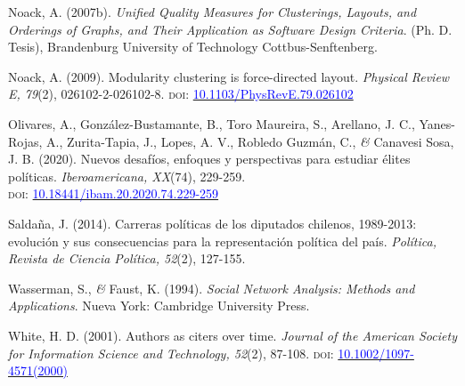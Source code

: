 \documentclass[a4paper]{tufte-handout}
\begin{document}
{\begin{list}{}
\item{\small Noack, A. (2007b). {\itshape Unified Quality Measures for Clusterings, Layouts, and Orderings of Graphs, and Their Application as Software Design Criteria}. (Ph. D. Tesis), Brandenburg University of Technology Cottbus-Senftenberg.}

\item{\small Noack, A. (2009). Modularity clustering is force-directed layout. {\itshape Physical Review E, 79}(2), 026102-2-026102-8. {\scshape doi:} \href{https://doi.org/10.1103/PhysRevE.79.026102}{\textcolor{blue}{10.1103/PhysRevE.79.026102}}}

\item{\small Olivares, A., González-Bustamante, B., Toro Maureira, S., Arellano, J. C., Yanes-Rojas, A., Zurita-Tapia, J., Lopes, A. V., Robledo Guzmán, C., {\itshape \&} Canavesi Sosa, J. B. (2020). Nuevos desafíos, enfoques y perspectivas para estudiar élites políticas. {\itshape Iberoamericana, XX}(74), 229-259. \\ {\scshape doi:} \href{http://doi.org/10.18441/ibam.20.2020.74.229-259}{\textcolor{blue}{10.18441/ibam.20.2020.74.229-259}}}


\item{\small Salda\~na, J. (2014). Carreras pol\'iticas de los diputados chilenos, 1989-2013: evoluci\'on y sus consecuencias para la representaci\'on pol\'itica del pa\'is. {\itshape Pol\'itica, Revista de Ciencia Pol\'itica, 52}(2), 127-155.}

\item{\small Wasserman, S., {\itshape \&} Faust, K. (1994). {\itshape Social Network Analysis: Methods and Applications}. Nueva York: Cambridge University Press.}

\item{\small White, H. D. (2001). Authors as citers over time. {\itshape Journal of the American Society for Information Science and Technology, 52}(2), 87-108. {\scshape doi}: \href{https://doi.org/10.1002/1097-4571(2000)9999:9999\%3C::AID-ASI1542\%3E3.0.CO;2-T}{\textcolor{blue}{10.1002/1097-4571(2000)}}}
\end{list}

}
\end{document}
